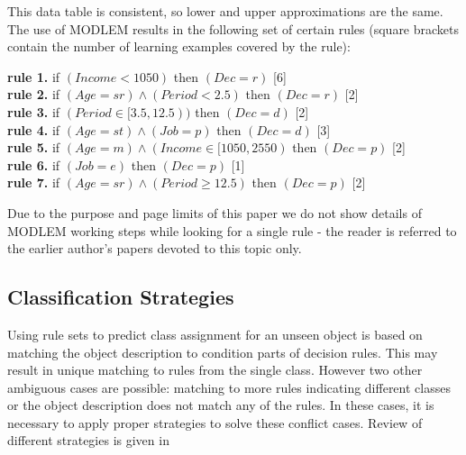 \documentclass{llncs}
\begin{document}
This data table is consistent, so lower and upper approximations are the
same. The use of MODLEM results in the following set of certain rules
(square brackets contain the number of learning examples covered by the
rule):

{\bf rule 1.} \hspace*{.3cm} if $(Income < 1050)$ then $(Dec = r)$  [6]\\
\hspace*{.4cm} {\bf rule 2.} \hspace*{.3cm} if $(Age = sr) \wedge (Period <
2.5)$ then $(Dec = r)$ [2] \\ \hspace*{.4cm}  {\bf rule 3.} \hspace*{.3cm}
if $(Period \in [3.5, 12.5))$ then $(Dec = d)$ [2]\\ \hspace*{.4cm} {\bf
rule 4.} \hspace*{.3cm} if $(Age = st) \wedge (Job = p)$ then $(Dec = d)$
[3]
\\
 \hspace*{.4cm} {\bf rule 5.} \hspace*{.3cm} if $(Age = m) \wedge (Income \in [1050, 2550)$ then $(Dec = p)$ [2]\\
\hspace*{.4cm} {\bf rule 6.} \hspace*{.3cm} if $(Job = e)$ then $(Dec = p)$
[1]
\\ \hspace*{.4cm}  {\bf rule 7.} \hspace*{.3cm} if $(Age = sr) \wedge
(Period \geq 12.5)$ then $(Dec = p)$ [2]


Due to the purpose and page limits of this paper we do not show details of
MODLEM working steps while looking for a single rule - the reader is
referred to the earlier author's papers devoted to this topic only.

\subsection{Classification Strategies}

Using rule sets to predict class assignment for an unseen object is based on
matching the object description to condition parts of decision rules. This
may result in unique matching to rules from the single class. However two
other ambiguous cases are possible: matching to more rules indicating
different classes or the object description does not match any of the rules.
In these cases, it is necessary to apply proper strategies to solve these
conflict cases. Review of different strategies is given in \cite{habcia}
\end{document}
